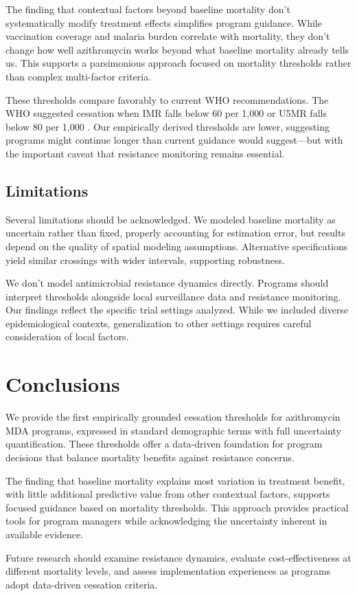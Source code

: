 \documentclass[11pt]{article}\usepackage[]{graphicx}\usepackage[]{xcolor}
\begin{document}
The finding that contextual factors beyond baseline mortality don't systematically modify treatment effects simplifies program guidance. While vaccination coverage and malaria burden correlate with mortality, they don't change how well azithromycin works beyond what baseline mortality already tells us. This supports a parsimonious approach focused on mortality thresholds rather than complex multi-factor criteria.

These thresholds compare favorably to current WHO recommendations. The WHO suggested cessation when IMR falls below 60 per 1,000 or U5MR falls below 80 per 1,000 \citep{who2020guidelines}. Our empirically derived thresholds are lower, suggesting programs might continue longer than current guidance would suggest---but with the important caveat that resistance monitoring remains essential.

\subsection{Limitations}

Several limitations should be acknowledged. We modeled baseline mortality as uncertain rather than fixed, properly accounting for estimation error, but results depend on the quality of spatial modeling assumptions. Alternative specifications yield similar crossings with wider intervals, supporting robustness.

We don't model antimicrobial resistance dynamics directly. Programs should interpret thresholds alongside local surveillance data and resistance monitoring. Our findings reflect the specific trial settings analyzed. While we included diverse epidemiological contexts, generalization to other settings requires careful consideration of local factors.

\section{Conclusions}

We provide the first empirically grounded cessation thresholds for azithromycin MDA programs, expressed in standard demographic terms with full uncertainty quantification. These thresholds offer a data-driven foundation for program decisions that balance mortality benefits against resistance concerns.

The finding that baseline mortality explains most variation in treatment benefit, with little additional predictive value from other contextual factors, supports focused guidance based on mortality thresholds. This approach provides practical tools for program managers while acknowledging the uncertainty inherent in available evidence.

Future research should examine resistance dynamics, evaluate cost-effectiveness at different mortality levels, and assess implementation experiences as programs adopt data-driven cessation criteria.


\clearpage


\end{document}
